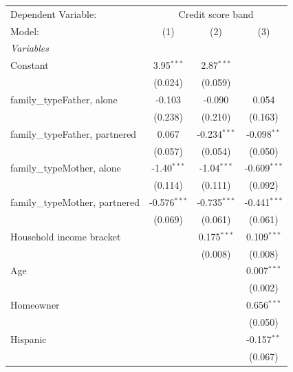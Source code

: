 
\begingroup
\centering
\begin{tabular}{lccc}
   \tabularnewline \midrule \midrule
   Dependent Variable: & \multicolumn{3}{c}{Credit score band}\\
   Model:                         & (1)            & (2)            & (3)\\  
   \midrule
   \emph{Variables}\\
   Constant                       & 3.95$^{***}$   & 2.87$^{***}$   &   \\   
                                  & (0.024)        & (0.059)        &   \\   
   family\_typeFather, alone      & -0.103         & -0.090         & 0.054\\   
                                  & (0.238)        & (0.210)        & (0.163)\\   
   family\_typeFather, partnered  & 0.067          & -0.234$^{***}$ & -0.098$^{**}$\\   
                                  & (0.057)        & (0.054)        & (0.050)\\   
   family\_typeMother, alone      & -1.40$^{***}$  & -1.04$^{***}$  & -0.609$^{***}$\\   
                                  & (0.114)        & (0.111)        & (0.092)\\   
   family\_typeMother, partnered  & -0.576$^{***}$ & -0.735$^{***}$ & -0.441$^{***}$\\   
                                  & (0.069)        & (0.061)        & (0.061)\\   
   Household income bracket       &                & 0.175$^{***}$  & 0.109$^{***}$\\   
                                  &                & (0.008)        & (0.008)\\   
   Age                            &                &                & 0.007$^{***}$\\   
                                  &                &                & (0.002)\\   
   Homeowner                      &                &                & 0.656$^{***}$\\   
                                  &                &                & (0.050)\\   
   Hispanic                       &                &                & -0.157$^{**}$\\   
                                  &                &                & (0.067)\\   

\end{tabular}

